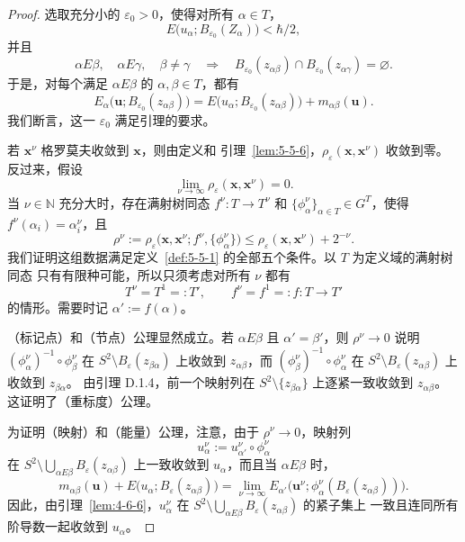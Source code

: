 \begin{proof}
选取充分小的 $\varepsilon_0>0$，使得对所有 $\alpha\in T$，
\[
  E\bigl(u_\alpha;B_{\varepsilon_0}(Z_\alpha)\bigr)<\hbar/2,
\]
并且
\[
  \alpha E\beta,\quad \alpha E\gamma,\quad\beta\ne\gamma
  \quad\Longrightarrow\quad
  B_{\varepsilon_0}(z_{\alpha\beta})
  \cap B_{\varepsilon_0}(z_{\alpha\gamma})=\varnothing.
\]
于是，对每个满足 $\alpha E\beta$ 的 $\alpha,\beta\in T$，都有
\[
  E_\alpha\bigl(\mathbf u;B_{\varepsilon_0}(z_{\alpha\beta})\bigr)
  =E\bigl(u_\alpha;B_{\varepsilon_0}(z_{\alpha\beta})\bigr)
   +m_{\alpha\beta}(\mathbf u).
\]
我们断言，这一 $\varepsilon_0$ 满足引理的要求。

若 $\mathbf x^\nu$ 格罗莫夫收敛到 $\mathbf x$，则由定义和
引理~\ref{lem:5-5-6}，$\rho_\varepsilon(\mathbf x,\mathbf x^\nu)$ 收敛到零。
反过来，假设
\[
  \lim_{\nu\to\infty}
  \rho_\varepsilon(\mathbf x,\mathbf x^\nu)=0.
\]
当 $\nu\in\mathbb N$ 充分大时，存在满射树同态 $f^\nu:T\to T^\nu$ 和
$\{\phi_\alpha^\nu\}_{\alpha\in T}\in G^T$，使得
$f^\nu(\alpha_i)=\alpha_i^\nu$，且
\[
  \rho^\nu
  :=\rho_\varepsilon
    \bigl(\mathbf x,\mathbf x^\nu;f^\nu,
      \{\phi_\alpha^\nu\}\bigr)
  \le\rho_\varepsilon(\mathbf x,\mathbf x^\nu)+2^{-\nu}.
\]
我们证明这组数据满足定义~\ref{def:5-5-1} 的全部五个条件。以 $T$ 为定义域的满射树同态
只有有限种可能，所以只须考虑对所有 $\nu$ 都有
\[
  T^\nu=T^1=:T',
  \qquad
  f^\nu=f^1=:f:T\to T'
\]
的情形。需要时记 $\alpha':=f(\alpha)$。

（标记点）和（节点）公理显然成立。若 $\alpha E\beta$ 且 $\alpha'=\beta'$，则
$\rho^\nu\to0$ 说明
$(\phi_\alpha^\nu)^{-1}\circ\phi_\beta^\nu$ 在
$S^2\setminus B_\varepsilon(z_{\beta\alpha})$ 上收敛到 $z_{\alpha\beta}$，而
$(\phi_\beta^\nu)^{-1}\circ\phi_\alpha^\nu$ 在
$S^2\setminus B_\varepsilon(z_{\alpha\beta})$ 上收敛到 $z_{\beta\alpha}$。
由引理 D.1.4，前一个映射列在
$S^2\setminus\{z_{\beta\alpha}\}$ 上逐紧一致收敛到 $z_{\alpha\beta}$。
这证明了（重标度）公理。

为证明（映射）和（能量）公理，注意，由于 $\rho^\nu\to0$，映射列
\[
  u_\alpha^\nu:=u_{\alpha'}^\nu\circ\phi_\alpha^\nu
\]
在
$S^2\setminus\bigcup_{\alpha E\beta}B_\varepsilon(z_{\alpha\beta})$ 上一致收敛到
$u_\alpha$，而且当 $\alpha E\beta$ 时，
\begin{equation}\label{eq:5-5-4}
  m_{\alpha\beta}(\mathbf u)
  +E\bigl(u_\alpha;B_\varepsilon(z_{\alpha\beta})\bigr)
  =\lim_{\nu\to\infty}
  E_{\alpha'}\bigl(\mathbf u^\nu;
    \phi_\alpha^\nu(B_\varepsilon(z_{\alpha\beta}))\bigr).
\end{equation}
因此，由引理~\ref{lem:4-6-6}，$u_\alpha^\nu$ 在
$S^2\setminus\bigcup_{\alpha E\beta}B_\varepsilon(z_{\alpha\beta})$ 的紧子集上
一致且连同所有阶导数一起收敛到 $u_\alpha$。


\end{proof}
